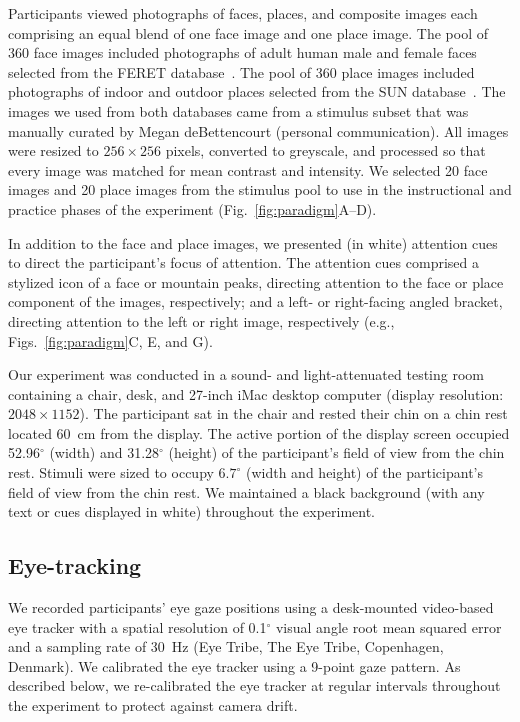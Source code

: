 \documentclass[english]{article}
\begin{document}
Participants viewed photographs of faces, places, and composite images each
comprising an equal blend of one face image and one place image. The pool of
360 face images included photographs of adult human male and female faces
selected from the FERET database~\citep{PhilEtal98}. The pool of 360 place
images included photographs of indoor and outdoor places selected from the SUN
database~\citep{XiaoEtal10}. The images we used from both databases came from a
stimulus subset that was manually curated by Megan deBettencourt (personal
communication). All images were resized to $256 \times 256$ pixels, converted
to greyscale, and processed so that every image was matched for mean contrast
and intensity. We selected 20 face images and 20 place images from the stimulus
pool to use in the instructional and practice phases of the experiment
(Fig.~\ref{fig:paradigm}A--D).

In addition to the face and place images, we presented (in white) attention
cues to direct the participant's focus of attention. The attention cues
comprised a stylized icon of a face or mountain peaks, directing attention to
the face or place component of the images, respectively; and a left- or
right-facing angled bracket, directing attention to the left or right image,
respectively (e.g., Figs.~\ref{fig:paradigm}C, E, and G).

 Our experiment was conducted in a sound- and light-attenuated testing room
 containing a chair, desk, and 27-inch iMac desktop computer (display
 resolution: $2048 \times 1152$). The participant sat in the chair and rested
 their chin on a chin rest located 60~cm from the display. The active portion
 of the display screen occupied 52.96$^\circ$ (width) and 31.28$^\circ$
 (height) of the participant's field of view from the chin rest. Stimuli were
 sized to occupy $6.7^\circ$ (width and height) of the participant's field of
 view from the chin rest. We maintained a black background (with any text or
 cues displayed in white) throughout the experiment.

\subsection*{Eye-tracking}

We recorded participants' eye gaze positions using a desk-mounted video-based
eye tracker with a spatial resolution of 0.1$^\circ$ visual angle root mean
squared error and a sampling rate of 30~Hz (Eye Tribe, The Eye Tribe,
Copenhagen, Denmark). We calibrated the eye tracker using a 9-point gaze
pattern. As described below, we re-calibrated the eye tracker at regular
intervals throughout the experiment to protect against camera drift.
\end{document}
